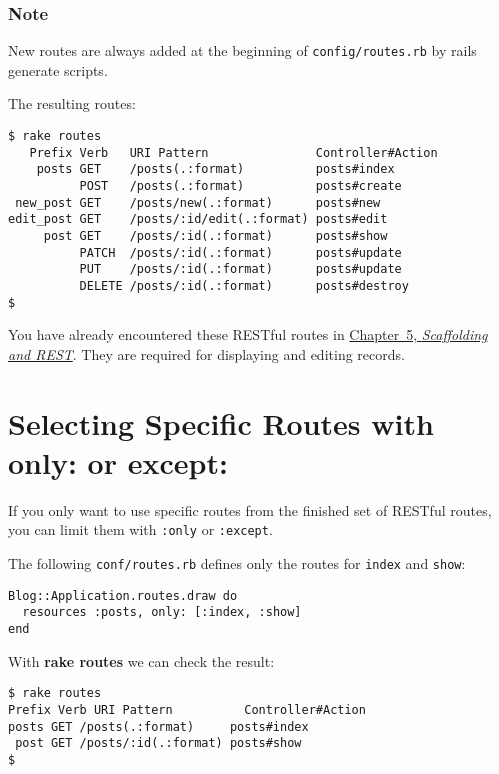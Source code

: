 \documentclass[a4paper]{book}
\newcommand{\chap}[1]{\newpage\thispagestyle{empty}\chapter{#1}\label{chap:\thechapter}}
\begin{document}
\subsection{Note}\label{note-37}

New routes are always added at the beginning of \texttt{config/routes.rb} by rails generate scripts.

The resulting routes:

\begin{shaded}\begin{verbatim}
$ rake routes
   Prefix Verb   URI Pattern               Controller#Action
    posts GET    /posts(.:format)          posts#index
          POST   /posts(.:format)          posts#create
 new_post GET    /posts/new(.:format)      posts#new
edit_post GET    /posts/:id/edit(.:format) posts#edit
     post GET    /posts/:id(.:format)      posts#show
          PATCH  /posts/:id(.:format)      posts#update
          PUT    /posts/:id(.:format)      posts#update
          DELETE /posts/:id(.:format)      posts#destroy
$
\end{verbatim}\end{shaded}

You have already encountered these RESTful routes in \hyperref[scaffolding]{Chapter~5, \emph{Scaffolding and REST}}. They are required for displaying and editing records.

\chap{Selecting Specific Routes with only: or except:}\label{selecting-specific-routes-with-only-or-except}

If you only want to use specific routes from the finished set of RESTful routes, you can limit them with \texttt{:only} or \texttt{:except}.

The following \texttt{conf/routes.rb} defines only the routes for \texttt{index} and \texttt{show}:

\begin{shaded}\begin{verbatim}
Blog::Application.routes.draw do
  resources :posts, only: [:index, :show]
end
\end{verbatim}\end{shaded}

With \textbf{rake routes} we can check the result:

\begin{shaded}\begin{verbatim}
$ rake routes
Prefix Verb URI Pattern          Controller#Action
posts GET /posts(.:format)     posts#index
 post GET /posts/:id(.:format) posts#show
$
\end{verbatim}\end{shaded}
\end{document}
